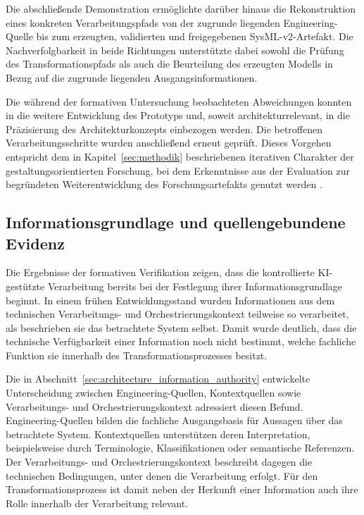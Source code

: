 Die abschließende Demonstration ermöglichte darüber hinaus die
Rekonstruktion eines konkreten Verarbeitungspfads von der zugrunde liegenden
Engineering-Quelle bis zum erzeugten, validierten und freigegebenen
SysML-v2-Artefakt. Die Nachverfolgbarkeit in beide Richtungen unterstützte
dabei sowohl die Prüfung des Transformationspfads als auch die Beurteilung
des erzeugten Modells in Bezug auf die zugrunde liegenden
Ausgangsinformationen.

Die während der formativen Untersuchung beobachteten Abweichungen konnten
in die weitere Entwicklung des Prototyps und, soweit architekturrelevant,
in die Präzisierung des Architekturkonzepts einbezogen werden. Die
betroffenen Verarbeitungsschritte wurden anschließend erneut geprüft.
Dieses Vorgehen entspricht dem in Kapitel~\ref{sec:methodik} beschriebenen
iterativen Charakter der gestaltungsorientierten Forschung, bei dem
Erkenntnisse aus der Evaluation zur begründeten Weiterentwicklung des
Forschungsartefakts genutzt werden
\cite{Wieringa2014}.

\subsection{Informationsgrundlage und quellengebundene Evidenz}
\label{sec:discussion_information_basis}

Die Ergebnisse der formativen Verifikation zeigen, dass die kontrollierte
KI-gestützte Verarbeitung bereits bei der Festlegung ihrer
Informationsgrundlage beginnt. In einem frühen Entwicklungsstand wurden
Informationen aus dem technischen Verarbeitungs- und Orchestrierungskontext
teilweise so verarbeitet, als beschrieben sie das betrachtete System selbst.
Damit wurde deutlich, dass die technische Verfügbarkeit einer Information
noch nicht bestimmt, welche fachliche Funktion sie innerhalb des
Transformationsprozesses besitzt.

Die in Abschnitt~\ref{sec:architecture_information_authority} entwickelte
Unterscheidung zwischen Engineering-Quellen, Kontextquellen sowie
Verarbeitungs- und Orchestrierungskontext adressiert diesen Befund.
Engineering-Quellen bilden die fachliche Ausgangsbasis für Aussagen über das
betrachtete System. Kontextquellen unterstützen deren Interpretation,
beispielsweise durch Terminologie, Klassifikationen oder semantische
Referenzen. Der Verarbeitungs- und Orchestrierungskontext beschreibt dagegen
die technischen Bedingungen, unter denen die Verarbeitung erfolgt. Für den
Transformationsprozess ist damit neben der Herkunft einer Information auch
ihre Rolle innerhalb der Verarbeitung relevant.

